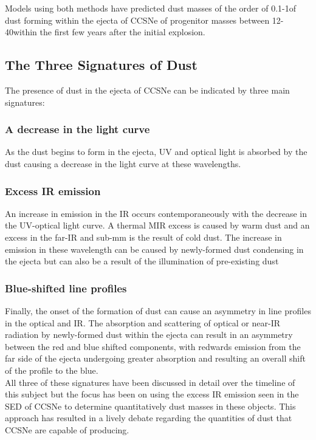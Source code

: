 Models using both methods have predicted dust masses of the order of 0.1-1\msun of dust forming within the ejecta of CCSNe of progenitor masses between 12-40\msun within the first few years after the initial explosion.

\subsection{The Three Signatures of Dust}
\label{three_sigs}
The presence of dust in the ejecta of CCSNe can be indicated by three main signatures: 

\subsubsection{A decrease in the light curve} 
As the dust begins to form in the ejecta, UV and optical light is absorbed by the dust causing a decrease in the light curve at these wavelengths.

\subsubsection{Excess IR emission}
An increase in emission in the IR occurs contemporaneously with the decrease in the UV-optical light curve.  A thermal MIR excess is caused by warm dust and an excess in the far-IR and sub-mm is the result of cold dust.  The increase in emission in these wavelength can be caused by newly-formed dust condensing in the ejecta but can also be a result of the illumination of pre-existing dust

\subsubsection{Blue-shifted line profiles}
Finally, the onset of the formation of dust can cause an asymmetry in line profiles in the optical and IR.  The absorption and scattering of optical or near-IR radiation by newly-formed dust within the ejecta can result in an asymmetry between the red and blue shifted components, with redwards 
emission from the far side of the ejecta undergoing greater absorption and resulting an overall shift of the profile to the blue.
\\

\noindent All three of these signatures have been discussed in detail over the timeline of this subject but the focus has been on using the excess IR emission seen in the SED of CCSNe to determine quantitatively dust masses in these objects.  This approach has resulted in a lively debate regarding the quantities of dust that CCSNe are capable of producing.
 
